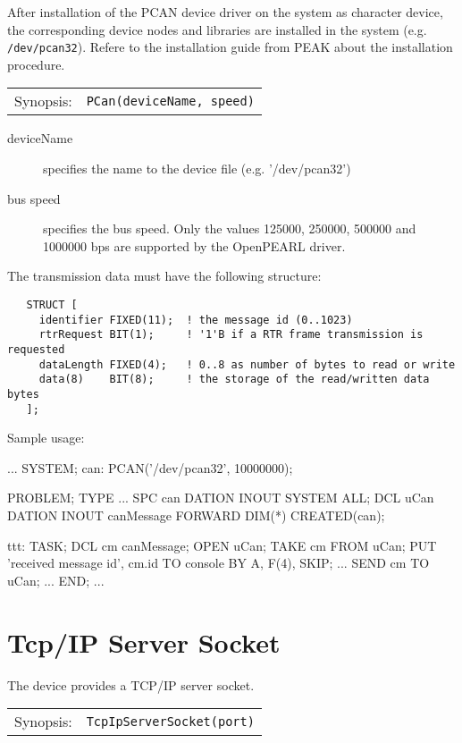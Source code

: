 After installation of the PCAN device driver on the system as character 
device, the corresponding device nodes and libraries are installed 
in the system (e.g. \verb|/dev/pcan32|). Refere to the installation guide 
from PEAK about the installation procedure.


\begin{tabular}{ll}
Synopsis: & \verb|PCan(deviceName, speed)|\\ 
\end{tabular}

\begin{description}
\item[deviceName] specifies the name to the device file (e.g. '/dev/pcan32')
\item[bus speed] specifies the bus speed. 
Only the values 125000, 250000, 500000 and 1000000 bps are supported by 
the OpenPEARL driver.
\end{description}

The transmission data must have the following structure:

\begin{verbatim}
   STRUCT [
     identifier FIXED(11);  ! the message id (0..1023) 
     rtrRequest BIT(1);     ! '1'B if a RTR frame transmission is requested
     dataLength FIXED(4);   ! 0..8 as number of bytes to read or write
     data(8)    BIT(8);     ! the storage of the read/written data bytes
   ];
\end{verbatim}

Sample usage:
\begin{PEARLCode}
...
SYSTEM;
   can: PCAN('/dev/pcan32', 10000000);

PROBLEM;
   TYPE ... 
   SPC can DATION INOUT SYSTEM ALL;
   DCL uCan DATION INOUT canMessage FORWARD DIM(*) CREATED(can);

ttt: TASK;
   DCL cm canMessage;
   OPEN uCan;
   TAKE cm FROM uCan;
   PUT 'received message id', cm.id TO console BY A, F(4), SKIP;
...
   SEND cm TO uCan;
...
END;
...
\end{PEARLCode}

\section{Tcp/IP Server Socket}
The device provides a TCP/IP server socket.

\begin{tabular}{ll}
Synopsis: & \verb|TcpIpServerSocket(port)|\\ 
\end{tabular}

